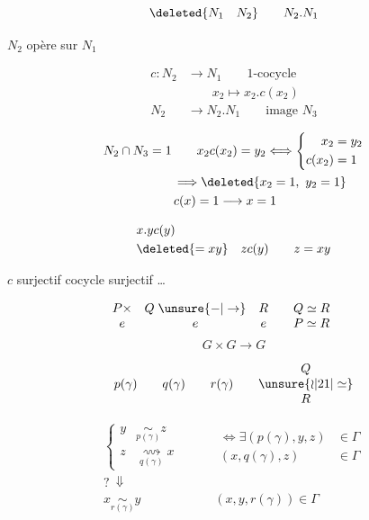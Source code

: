 \[\deleted{N_1\quad N_2}\qquad N_2.N_1\]

$N_2$ opère sur $N_1$

\[
\begin{aligned}
c:N_2&\to N_1\qquad\text{1-cocycle}\\
&\qquad x_2\mapsto x_2.c(x_2)\\
N_2&\to N_2.N_1\qquad\text{image }N_3
\end{aligned}
\]

\[
\begin{aligned}
N_2\cap N_3&=1\qquad x_2c(x_2)=y_2\Longleftrightarrow
\left\{\begin{aligned}x_2&=y_2\\c(x_2)&=1\end{aligned}\right.\\
&\qquad\Longrightarrow\deleted{x_2=1,\ y_2=1}\\
&\qquad c(x)=1\longrightarrow x=1
\end{aligned}
\]

\[
\begin{aligned}
&x.yc(y)\\
&\deleted{=xy}\quad zc(y)\qquad z=xy
\end{aligned}
\]

$c$ surjectif cocycle surjectif \ldots


\[
\begin{array}{ccc@{\qquad}l}
P\times&Q\mathrel{\unsure{-|\to}}&R&Q\simeq R\\
e&e&e&P\simeq R
\end{array}
\qquad
\]\[G\times G\longrightarrow G\]


\[
p(\gamma)\qquad q(\gamma)\qquad r(\gamma)
\qquad\begin{matrix} Q\\\unsure{\wr|21|\simeq}\\R\end{matrix}
\]

\[
\begin{aligned}
\left\{\begin{aligned}
y&\underset{p(\gamma)}{\sim}z\\
z&\underset{q(\gamma)}{\rightsquigarrow}x
\end{aligned}\right.
&\qquad\begin{aligned}
\Longleftrightarrow\exists(p(\gamma),y,z)&\in\Gamma\\
(x,q(\gamma),z)&\in\Gamma
\end{aligned}\\
?\ \Downarrow&\\
x\underset{r(\gamma)}{\sim}y&\qquad (x,y,r(\gamma))\in\Gamma
\end{aligned}
\]

